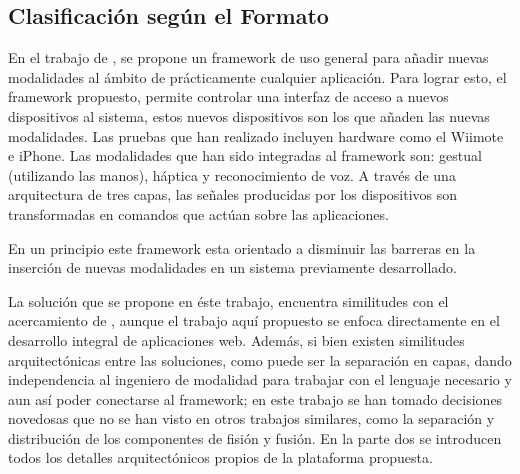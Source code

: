 \subsection{Clasificación según el Formato}

En el trabajo de \citet{lo2010introduction}, se propone un framework de uso general para añadir nuevas modalidades al ámbito de prácticamente cualquier aplicación. Para lograr esto, el framework propuesto, permite controlar una interfaz de acceso a nuevos dispositivos al sistema, estos nuevos dispositivos son los que añaden las nuevas modalidades. Las pruebas que han realizado incluyen hardware como el Wiimote e iPhone. Las modalidades que han sido integradas al framework son: gestual (utilizando las manos), háptica y reconocimiento de voz. A través de una arquitectura de tres capas, las señales producidas por los dispositivos son transformadas en comandos que actúan sobre las aplicaciones.

En un principio este framework esta orientado a disminuir las barreras en la inserción de nuevas modalidades en un sistema previamente desarrollado. 

La solución que se propone en éste trabajo, encuentra similitudes con el acercamiento de \citet{lo2010introduction}, aunque el trabajo aquí propuesto se enfoca directamente en el desarrollo integral de aplicaciones web. Además, si bien existen similitudes arquitectónicas entre las soluciones, como puede ser la separación en capas, dando independencia al ingeniero de modalidad para trabajar con el lenguaje necesario y aun así poder conectarse al framework; en este trabajo se han tomado decisiones novedosas que no se han visto en otros trabajos similares, como la separación y distribución de los componentes de fisión y fusión. En la parte dos se introducen todos los detalles arquitectónicos propios de la plataforma propuesta.


